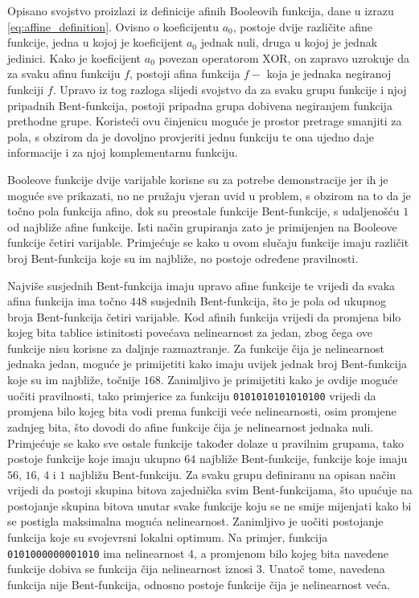 Opisano svojstvo proizlazi iz definicije afinih Booleovih funkcija, dane u izrazu \eqref{eq:affine_definition}.
Ovisno o koeficijentu $a_0$, postoje dvije različite afine funkcije, jedna u kojoj je koeficijent $a_0$ jednak nuli, druga u kojoj je jednak jedinici.
Kako je koeficijent $a_0$ povezan operatorom XOR, on zapravo uzrokuje da za svaku afinu funkciju $f$, postoji afina funkcija $f-$ koja je jednaka negiranoj funkciji $f$.
Upravo iz tog razloga slijedi svojstvo da za svaku grupu funkcije i njoj pripadnih Bent-funkcija, postoji pripadna grupa dobivena negiranjem funkcija prethodne grupe.
Koristeći ovu činjenicu moguće je prostor pretrage smanjiti za pola, s obzirom da je dovoljno provjeriti jednu funkciju te ona ujedno daje informacije i za njoj komplementarnu funkciju.

Booleove funkcije dvije varijable korisne su za potrebe demonstracije jer ih je moguće sve prikazati, no ne pružaju vjeran uvid u problem, s obzirom na to da je točno pola funkcija afino, dok su preostale funkcije Bent-funkcije, s udaljenošću $1$ od najbliže afine funkcije.
Isti način grupiranja zato je primijenjen na Booleove funkcije četiri varijable.
Primjećuje se kako u ovom slučaju funkcije imaju različit broj Bent-funkcija koje su im najbliže, no postoje određene pravilnosti.

Najviše susjednih Bent-funkcija imaju upravo afine funkcije te vrijedi da svaka afina funkcija ima točno $448$ susjednih Bent-funkcija, što je pola od ukupnog broja Bent-funkcija četiri varijable.
Kod afinih funkcija vrijedi da promjena bilo kojeg bita tablice istinitosti povećava nelinearnost za jedan, zbog čega ove funkcije nisu korisne za daljnje razmaztranje.
Za funkcije čija je nelinearnost jednaka jedan, moguće je primijetiti kako imaju uvijek jednak broj Bent-funkcija koje su im najbliže, točnije $168$.
Zanimljivo je primijetiti kako je ovdije moguće uočiti pravilnosti, tako primjerice za funkciju \texttt{0101010101010100} vrijedi da promjena bilo kojeg bita vodi prema funkciji veće nelinearnosti, osim promjene zadnjeg bita, što dovodi do afine funkcije čija je nelinearnost jednaka nuli.
Primjećuje se kako sve ostale funkcije također dolaze u pravilnim grupama, tako postoje funkcije koje imaju ukupno $64$ najbliže Bent-funkcije, funkcije koje imaju $56$, $16$, $4$ i $1$ najbližu Bent-funkciju.
Za svaku grupu definiranu na opisan način vrijedi da postoji skupina bitova zajednička svim Bent-funkcijama, što upućuje na postojanje skupina bitova unutar svake funkcije koju se ne smije mijenjati kako bi se postigla maksimalna moguća nelinearnost.
Zanimljivo je uočiti postojanje funkcija koje su svojevrsni lokalni optimum.
Na primjer, funkcija \texttt{0101000000001010} ima nelinearnost $4$, a promjenom bilo kojeg bita navedene funkcije dobiva se funkcija čija nelinearnost iznosi $3$.
Unatoč tome, navedena funkcija nije Bent-funkcija, odnosno postoje funkcije čija je nelinearnost veća.

